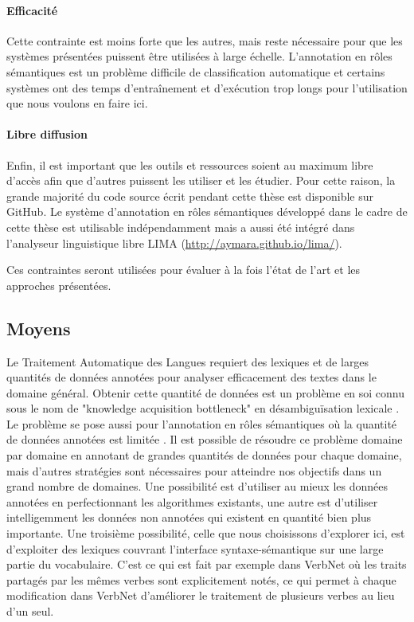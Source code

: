 \paragraph{Efficacité} Cette contrainte est moins forte que les autres, mais
reste nécessaire pour que les systèmes présentées puissent être utilisées à
large échelle. L'annotation en rôles sémantiques est un problème difficile de
classification automatique et certains systèmes ont des temps d'entraînement et
d'exécution trop longs pour l'utilisation que nous voulons en faire ici.

\paragraph{Libre diffusion} Enfin, il est important que les outils et
ressources soient au maximum libre d'accès afin que d'autres puissent les
utiliser et les étudier. Pour cette raison, la grande majorité du code source
écrit pendant cette thèse est disponible sur GitHub. Le système d'annotation en
rôles sémantiques développé dans le cadre de cette thèse est utilisable
indépendamment mais a aussi été intégré dans l'analyseur linguistique libre
LIMA (\url{http://aymara.github.io/lima/}).

Ces contraintes seront utilisées pour évaluer à la fois l'état de l'art et les
approches présentées.

\subsection{Moyens}
\label{objectifs_these}

Le Traitement Automatique des Langues requiert des lexiques et de larges
quantités de données annotées pour analyser efficacement des textes dans le
domaine général. Obtenir cette quantité de données est un problème en soi connu
sous le nom de "knowledge acquisition bottleneck" en désambiguïsation lexicale
\citep{gale1992method,navigli2009word}. Le problème se pose aussi pour
l'annotation en rôles sémantiques où la quantité de données annotées est
limitée \citep[section 1]{das2012structure}. Il est possible de résoudre ce problème
domaine par domaine en annotant de grandes quantités de données pour chaque
domaine, mais d'autres stratégies sont nécessaires pour atteindre nos objectifs
dans un grand nombre de domaines. Une possibilité est d'utiliser au mieux les
données annotées en perfectionnant les algorithmes existants, une autre est
d'utiliser intelligemment les données non annotées qui existent en quantité
bien plus importante. Une troisième possibilité, celle que nous choisissons
d'explorer ici, est d'exploiter des lexiques couvrant l'interface
syntaxe-sémantique sur une large partie du vocabulaire. C'est ce qui est fait
par exemple dans VerbNet où les traits partagés par les mêmes verbes sont
explicitement notés, ce qui permet à chaque modification dans VerbNet
d'améliorer le traitement de plusieurs verbes au lieu d'un seul.

